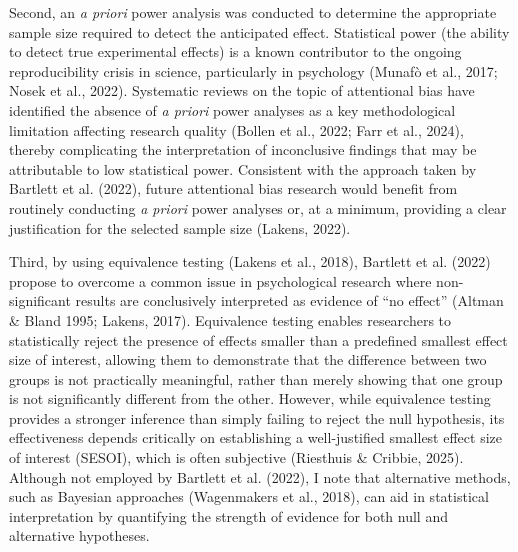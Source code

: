 \documentclass[authordate, reflection, issue]{jote-new-article}
\begin{document}
	Second, an \emph{a priori} power analysis was conducted to determine the appropriate sample size required to detect the anticipated effect. Statistical power (the ability to detect true experimental effects) is a known contributor to the ongoing reproducibility crisis in science, particularly in psychology (Munafò et al., 2017; Nosek et al., 2022). Systematic reviews on the topic of attentional bias have identified the absence of \emph{a priori} power analyses as a key methodological limitation affecting research quality (Bollen et al., 2022; Farr et al., 2024), thereby complicating the interpretation of inconclusive findings that may be attributable to low statistical power. Consistent with the approach taken by Bartlett et al. (2022), future attentional bias research would benefit from routinely conducting \emph{a priori} power analyses or, at a minimum, providing a clear justification for the selected sample size (Lakens, 2022).



	Third, by using equivalence testing (Lakens et al., 2018), Bartlett et al. (2022) propose to overcome a common issue in psychological research where non-significant results are conclusively interpreted as evidence of “no effect” (Altman \& Bland 1995; Lakens, 2017). Equivalence testing enables researchers to statistically reject the presence of effects smaller than a predefined smallest effect size of interest, allowing them to demonstrate that the difference between two groups is not practically meaningful, rather than merely showing that one group is not significantly different from the other. However, while equivalence testing provides a stronger inference than simply failing to reject the null hypothesis, its effectiveness depends critically on establishing a well-justified smallest effect size of interest (SESOI), which is often subjective (Riesthuis \& Cribbie, 2025). Although not employed by Bartlett et al. (2022), I note that alternative methods, such as Bayesian approaches (Wagenmakers et al., 2018), can aid in statistical interpretation by quantifying the strength of evidence for both null and alternative hypotheses.
\end{document}
